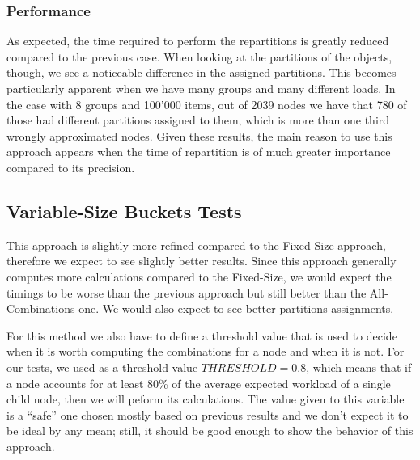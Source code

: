 \subsubsection{Performance}
As expected, the time required to perform the repartitions is greatly reduced compared to the previous case. When looking at the partitions of the objects, though, we see a noticeable difference in the assigned partitions. This becomes particularly apparent when we have many groups and many different loads. In the case with 8 groups and 100'000 items, out of 2039 nodes we have that 780 of those had different partitions assigned to them, which is more than one third wrongly approximated nodes. Given these results, the main reason to use this approach appears when the time of repartition is of much greater importance compared to its precision.

\subsection{Variable-Size Buckets Tests}\label{sec:Variable-Size-buckets-tests}
This approach is slightly more refined compared to the Fixed-Size approach, therefore we expect to see slightly better results. Since this approach generally computes more calculations compared to the Fixed-Size, we would expect the timings to be worse than the previous approach but still better than the All-Combinations one. We would also expect to see better partitions assignments.

For this method we also have to define a threshold value that is used to decide when it is worth computing the combinations for a node and when it is not. For our tests, we used as a threshold value $THRESHOLD = 0.8$, which means that if a node accounts for at least 80\% of the average expected workload of a single child node, then we will peform its calculations. The value given to this variable is a ``safe'' one chosen mostly based on previous results and we don't expect it to be ideal by any mean; still, it should be good enough to show the behavior of this approach.

